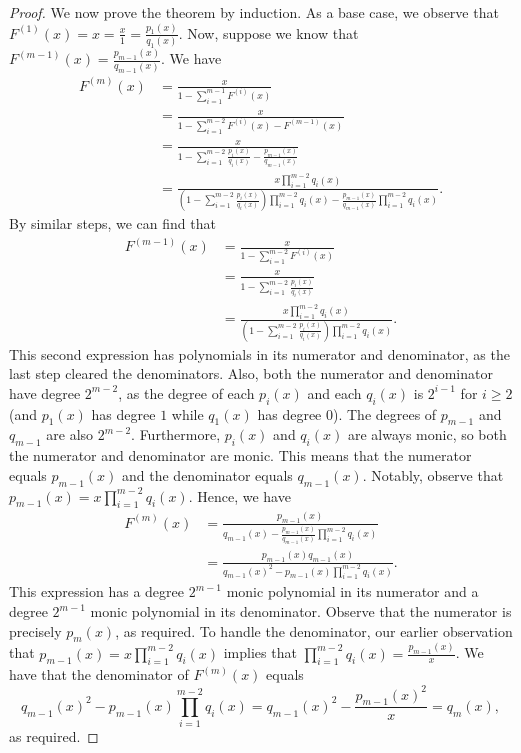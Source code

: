 \documentclass[12pt]{amsart}
\newcommand{\gfnoa}[1]{F^{(#1)}(x)}
\begin{document}
\begin{proof}
    We now prove the theorem by induction. As a base case, we observe that $\gfnoa{1}=x=\frac{x}{1}=\frac{p_1(x)}{q_1(x)}$. Now, suppose we know that $\gfnoa{m-1}=\frac{p_{m-1}(x)}{q_{m-1}(x)}$. We have
    \begin{align*}
        \gfnoa{m}&=\frac{x}{1-\sum_{i=1}^{m-1}\gfnoa{i}}\\
        &=\frac{x}{1-\sum_{i=1}^{m-2}\gfnoa{i}-\gfnoa{m-1}}\\
        &=\frac{x}{1-\sum_{i=1}^{m-2}\frac{p_i(x)}{q_i(x)}-\frac{p_{m-1}(x)}{q_{m-1}(x)}}\\
        &=\frac{x\prod_{i=1}^{m-2}q_i(x)}{\left(1-\sum_{i=1}^{m-2}\frac{p_i(x)}{q_i(x)}\right)\prod_{i=1}^{m-2}q_i(x)-\frac{p_{m-1}(x)}{q_{m-1}(x)}\prod_{i=1}^{m-2}q_i(x)}.
    \end{align*}
    By similar steps, we can find that
    \begin{align*}
        \gfnoa{m-1}&=\frac{x}{1-\sum_{i=1}^{m-2}\gfnoa{i}}\\
        &=\frac{x}{1-\sum_{i=1}^{m-2}\frac{p_i(x)}{q_i(x)}}\\
        &=\frac{x\prod_{i=1}^{m-2}q_i(x)}{\left(1-\sum_{i=1}^{m-2}\frac{p_i(x)}{q_i(x)}\right)\prod_{i=1}^{m-2}q_i(x)}.
    \end{align*}
    This second expression has polynomials in its numerator and denominator, as the last step cleared the denominators. Also, both the numerator and denominator have degree $2^{m-2}$, as the degree of each $p_i(x)$ and each $q_i(x)$ is $2^{i-1}$ for $i\geq2$ (and $p_1(x)$ has degree $1$ while $q_1(x)$ has degree $0$). The degrees of $p_{m-1}$ and $q_{m-1}$ are also $2^{m-2}$. 
    Furthermore, $p_i(x)$ and $q_i(x)$ are always monic, so both the numerator and denominator are monic. This means that 
    the numerator equals $p_{m-1}(x)$ and the denominator equals $q_{m-1}(x)$.
    Notably, observe that $p_{m-1}(x)=x\prod_{i=1}^{m-2}q_i(x)$. 
    Hence, we have
    \begin{align*}
        \gfnoa{m}&=\frac{p_{m-1}(x)}{q_{m-1}(x)-\frac{p_{m-1}(x)}{q_{m-1}(x)}\prod_{i=1}^{m-2}q_i(x)}\\
        &=\frac{p_{m-1}(x)q_{m-1}(x)}{q_{m-1}(x)^2-p_{m-1}(x)\prod_{i=1}^{m-2}q_i(x)}.
    \end{align*}
    This expression has a degree $2^{m-1}$ monic polynomial in its numerator and a degree $2^{m-1}$ monic polynomial in its denominator. Observe that the numerator is precisely $p_m(x)$, as required. To handle the denominator, our earlier observation that $p_{m-1}(x)=x\prod_{i=1}^{m-2}q_i(x)$ implies that $\prod_{i=1}^{m-2}q_i(x)=\frac{p_{m-1}(x)}{x}$. 
    We have that the denominator of $\gfnoa{m}$ equals
    \[
    q_{m-1}(x)^2-p_{m-1}(x)\prod_{i=1}^{m-2}q_i(x)=q_{m-1}(x)^2-\frac{p_{m-1}(x)^2}{x}=q_m(x),
    \]
    as required.
\end{proof}
\end{document}

